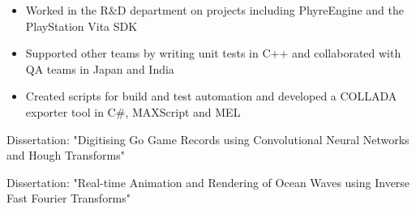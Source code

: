 \documentclass[10pt,a4paper,ragged2e,withhyper]{altacv}
\begin{document}
\begin{paracol}{2}
\divider

\begin{itemize}
\item Worked in the R\&D department on projects including PhyreEngine and the PlayStation Vita SDK
\item Supported other teams by writing unit tests in C++ and collaborated with QA teams in Japan and India
\item Created scripts for build and test automation and developed a COLLADA exporter tool in C\#, MAXScript and MEL
\end{itemize}
\medskip
{}    

\switchcolumn


Dissertation: "Digitising Go Game Records using Convolutional Neural Networks and Hough Transforms"

\medskip
{}    

\divider

Dissertation: "Real-time Animation and Rendering of Ocean Waves using Inverse Fast Fourier Transforms"

\medskip
{}    

\medskip





\medskip


\divider
{}
\divider


    

\end{paracol}
\end{document}
